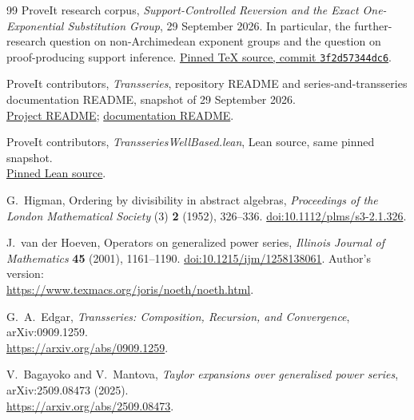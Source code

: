 \documentclass[11pt,a4paper]{article}
\theoremstyle{definition}
\theoremstyle{remark}
\begin{document}
\begingroup
\small
\begin{thebibliography}{99}
ProveIt research corpus,
\emph{Support-Controlled Reversion and the Exact One-Exponential
Substitution Group}, 29 September 2026.
In particular, the further-research question on non-Archimedean exponent
groups and the question on proof-producing support inference.
\href{https://github.com/VladimirReshetnikov/ProveIt/blob/3f2d57344dc6f0b3dfa376f9490bfe13d1beb81e/Analysis/Transseries/docs/series-and-transseries/Support_Controlled_Reversion_One_Exponential/reversion_and_one_exponential.tex}{Pinned TeX source, commit \texttt{3f2d57344dc6}}.

ProveIt contributors, \emph{Transseries}, repository README and
series-and-transseries documentation README, snapshot of 29 September 2026.\\
\href{https://github.com/VladimirReshetnikov/ProveIt/blob/3f2d57344dc6f0b3dfa376f9490bfe13d1beb81e/Analysis/Transseries/README.md}{Project README};
\href{https://github.com/VladimirReshetnikov/ProveIt/blob/3f2d57344dc6f0b3dfa376f9490bfe13d1beb81e/Analysis/Transseries/docs/series-and-transseries/README.md}{documentation README}.

ProveIt contributors, \emph{TransseriesWellBased.lean},
Lean source, same pinned snapshot.\\
\href{https://github.com/VladimirReshetnikov/ProveIt/blob/3f2d57344dc6f0b3dfa376f9490bfe13d1beb81e/Analysis/Transseries/Lean/Transseries/TransseriesWellBased.lean}{Pinned Lean source}.

G.~Higman, Ordering by divisibility in abstract algebras,
\emph{Proceedings of the London Mathematical Society} (3) \textbf{2}
(1952), 326--336.
\href{https://doi.org/10.1112/plms/s3-2.1.326}{doi:10.1112/plms/s3-2.1.326}.

J.~van der Hoeven, Operators on generalized power series,
\emph{Illinois Journal of Mathematics} \textbf{45} (2001), 1161--1190.
\href{https://doi.org/10.1215/ijm/1258138061}{doi:10.1215/ijm/1258138061}.
Author's version:\\
\url{https://www.texmacs.org/joris/noeth/noeth.html}.

G.~A.~Edgar, \emph{Transseries: Composition, Recursion, and Convergence},
arXiv:0909.1259.\\
\url{https://arxiv.org/abs/0909.1259}.

V.~Bagayoko and V.~Mantova,
\emph{Taylor expansions over generalised power series},
arXiv:2509.08473 (2025).\\
\url{https://arxiv.org/abs/2509.08473}.


\end{thebibliography}
\end{document}

